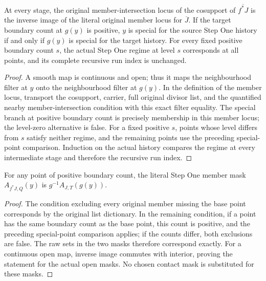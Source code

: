 \begin{lemma}
\label{hir:smooth-positive-member-special}
\leanok
At every stage, the original member-intersection locus of the cosupport of
$\overline{f^*J}$ is the inverse image of the literal original member locus
for $\overline J$. If the target boundary count at $g(y)$ is positive,
$y$ is special for the source Step One history if and only if $g(y)$ is
special for the target history. For every fixed positive boundary count
$s$, the actual Step One regime at level $s$ corresponds at all points,
and its complete recursive run index is unchanged.
\end{lemma}
\begin{proof}
A smooth map is continuous and open; thus it maps the neighbourhood filter
at $y$ onto the neighbourhood filter at $g(y)$. In the definition of the
member locus, transport the cosupport, carrier, full original divisor list,
and the quantified nearby member-intersection condition with this exact
filter equality. The special branch at positive boundary count is precisely
membership in this member locus; the level-zero alternative is false.
For a fixed positive $s$, points whose level differs from $s$ satisfy neither
regime, and the remaining points use the preceding special-point comparison.
Induction on the actual history compares the regime at every intermediate
stage and therefore the recursive run index.
\end{proof}

\begin{lemma}
\label{hir:smooth-positive-member-mask}
\leanok
For any point of positive boundary count, the literal Step One member mask
$A_{f^*J,Q}(y)$ is $g^{-1}A_{J,T}(g(y))$.
\end{lemma}
\begin{proof}
The condition excluding every original member missing the base point
corresponds by the original list dictionary. In the remaining condition,
if a point has the same boundary count as the base point, this count is
positive, and the preceding special-point comparison applies; if the counts
differ, both exclusions are false. The raw sets in the two masks therefore
correspond exactly. For a continuous open map, inverse image commutes with
interior, proving the statement for the actual open masks. No chosen contact
mask is substituted for these masks.
\end{proof}
